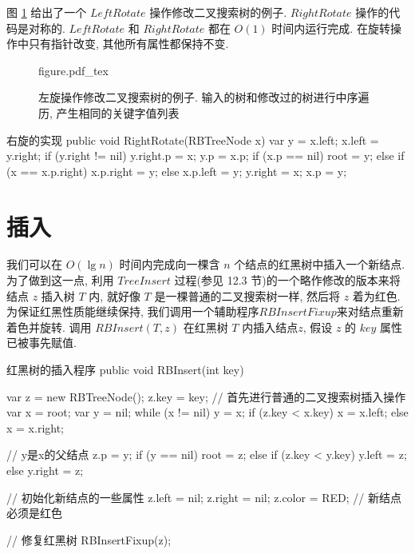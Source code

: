 \documentclass[oneside,10pt,fontset=none]{ctexbook}
\numberwithin{definition}{chapter}
\numberwithin{theorem}{chapter}
\numberwithin{lemma}{chapter}
\begin{document}
图 \ref{fig:左旋修改二叉树} 给出了一个 $LeftRotate$ 操作修改二叉搜索树的例子. $RightRotate$ 操作的代码是对称的. $LeftRotate$ 和 $RightRotate$ 都在 $O(1)$ 时间内运行完成. 在旋转操作中只有指针改变, 其他所有属性都保持不变.

\begin{figure}[htbp]
    \centering
    \def\svgwidth{\columnwidth}
    {figure.pdf_tex}
    \label{fig:左旋修改二叉树}
    \caption{左旋操作修改二叉搜索树的例子. 输入的树和修改过的树进行中序遍历, 产生相同的关键字值列表}
\end{figure}

\begin{myjava}{}{右旋的实现}{}
public void RightRotate(RBTreeNode x) {
    var y = x.left;
    x.left = y.right;
    if (y.right != nil)
        y.right.p = x;
    y.p = x.p;
    if (x.p == nil)
        root = y;
    else if (x == x.p.right)
        x.p.right = y;
    else
        x.p.left = y;
    y.right = x;
    x.p = y;
}
\end{myjava}

\section{插入}\label{section:红黑树的插入}

我们可以在 $O(\lg{n})$ 时间内完成向一棵含 $n$ 个结点的红黑树中插入一个新结点. 为了做到这一点, 利用 $TreeInsert$ 过程(参见 12.3 节)的一个略作修改的版本来将结点 $z$ 插入树 $T$ 内, 就好像 $T$ 是一棵普通的二叉搜索树一样, 然后将 $z$ 着为红色. 为保证红黑性质能继续保持, 我们调用一个辅助程序$RBInsertFixup$来对结点重新着色并旋转. 调用 $RBInsert(T, z)$ 在红黑树 $T$ 内插入结点$z$, 假设 $z$ 的 $key$ 属性已被事先赋值.

\begin{myjava}{}{红黑树的插入程序}{}
public void RBInsert(int key) {
    var z = new RBTreeNode();
    z.key = key;
    // 首先进行普通的二叉搜索树插入操作
    var x = root;
    var y = nil;
    while (x != nil) {
        y = x;
        if (z.key < x.key)
            x = x.left;
        else
            x = x.right;
    }

    // y是x的父结点
    z.p = y;
    if (y == nil)
        root = z;
    else if (z.key < y.key)
        y.left = z;
    else
        y.right = z;

    // 初始化新结点的一些属性
    z.left = nil;
    z.right = nil;
    z.color = RED; // 新结点必须是红色

    // 修复红黑树
    RBInsertFixup(z);
}
\end{myjava}
\end{document}
